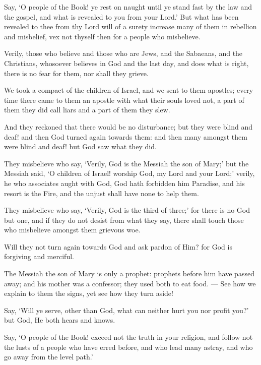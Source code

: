 \documentclass[fontsize=14pt, letterpaper, notitlepage, openany, DIV=12]{scrbook} %
\begin{document}
\noindent[5:68]
Say, `O people of the Book! ye rest on naught until ye stand fast by the law and the
gospel, and what is revealed to you from your Lord.' But what has been revealed to thee from
thy Lord will of a surety increase many of them in rebellion and misbelief, vex not thyself then
for a people who misbelieve.

\noindent[5:69]
Verily, those who believe and those who are Jews, and the Sabaeans, and the Christians,
whosoever believes in God and the last day, and does what is right, there is no fear for them, nor
shall they grieve.

\noindent[5:70]
We took a compact of the children of Israel, and we sent to them apostles; every time
there came to them an apostle with what their souls loved not, a part of them they did call liars
and a part of them they slew.

\noindent[5:71]
And they reckoned that there would be no disturbance; but they were blind and deaf! and
then God turned again towards them: and then many amongst them were blind and deaf! but God
saw what they did.

\noindent[5:72]
They misbelieve who say, `Verily, God is the Messiah the son of Mary;' but the Messiah
said, `O children of Israel! worship God, my Lord and your Lord;' verily, he who associates
aught with God, God hath forbidden him Paradise, and his resort is the Fire, and the unjust shall
have none to help them.

\noindent[5:73]
They misbelieve who say, `Verily, God is the third of three;' for there is no God but one,
and if they do not desist from what they say, there shall touch those who misbelieve amongst
them grievous woe.

\noindent[5:74]
Will they not turn again towards God and ask pardon of Him? for God is forgiving and
merciful.

\noindent[5:75]
The Messiah the son of Mary is only a prophet: prophets before him have passed away;
and his mother was a confessor; they used both to eat food. --- See how we explain to them the
signs, yet see how they turn aside!

\noindent[5:76]
Say, `Will ye serve, other than God, what can neither hurt you nor profit you?' but God,
He both hears and knows.

\noindent[5:77]
Say, `O people of the Book! exceed not the truth in your religion, and follow not the lusts
of a people who have erred before, and who lead many astray, and who go away from the level
path.'
\end{document}
